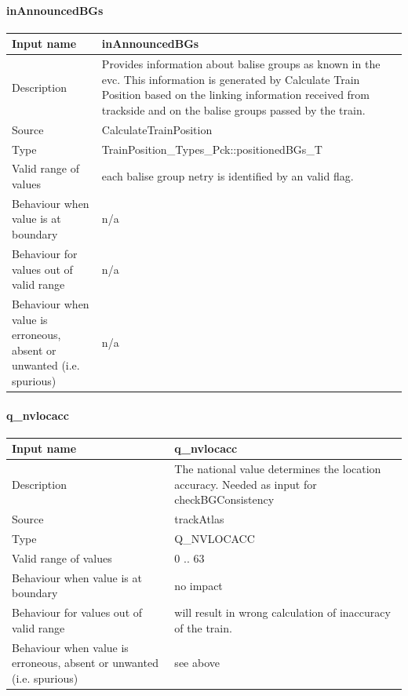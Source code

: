 \paragraph{inAnnouncedBGs}

\begin{longtable}{p{}p{}}
\toprule
Input name				& inAnnouncedBGs \\
\midrule
Description				& Provides information about balise groups as known in the evc. This information is generated by Calculate Train Position based on the linking information received from trackside and on the balise groups passed by the train.\\
\midrule
Source					& CalculateTrainPosition \\ 
\midrule
Type					& TrainPosition\_Types\_Pck::positionedBGs\_T \\
\midrule
Valid range of values	& each balise group netry is identified by an valid flag. \\
\midrule
Behaviour when value is at boundary	& n/a\\
\midrule
Behaviour for values out of valid range	& n/a\\
\midrule
Behaviour when value is erroneous, absent or unwanted (i.e. spurious) & n/a\\
\bottomrule
\end{longtable}


\paragraph{q\_nvlocacc}

\begin{longtable}{p{}p{}}
\toprule
Input name				& q\_nvlocacc \\
\midrule
Description				& The national value determines the location accuracy. Needed as input for checkBGConsistency  \\
\midrule
Source					& trackAtlas\\ 
\midrule
Type					& Q\_NVLOCACC \\
\midrule
Valid range of values	& 0 .. 63\\
\midrule
Behaviour when value is at boundary	& no impact\\
\midrule
Behaviour for values out of valid range	& will result in wrong calculation of inaccuracy of the train.\\
\midrule
Behaviour when value is erroneous, absent or unwanted (i.e. spurious) & see above\\
\bottomrule
\end{longtable}


